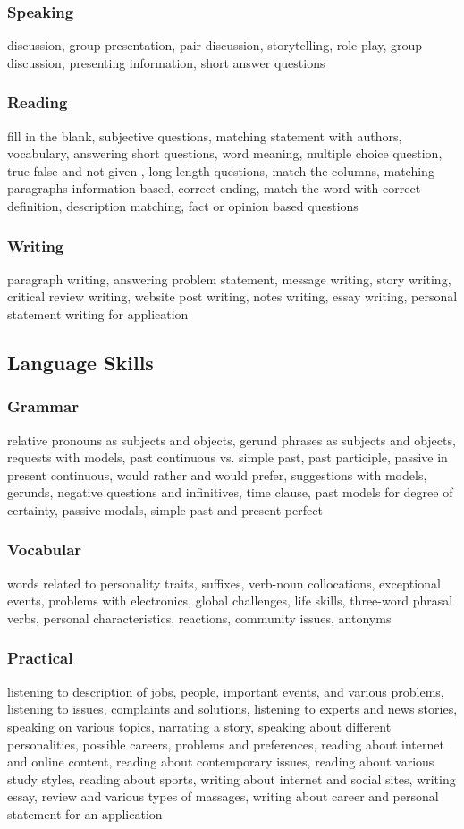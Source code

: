 \documentclass[twocolumn]{article}
\begin{document}
    \subsubsection*{Speaking}
    discussion, group presentation, pair discussion, storytelling, role play, group discussion, presenting information, short answer questions
    \subsubsection*{Reading}
    fill in the blank, subjective questions, matching statement with authors, vocabulary, answering short questions, word meaning, multiple choice question, true false and not given , long length questions, match the columns, matching paragraphs information based, correct ending, match the word with correct definition, description matching, fact or opinion based questions
    \subsubsection*{Writing}
    paragraph writing, answering problem statement, message writing, story writing, critical review writing, website post writing, notes writing, essay writing, personal statement writing for application
    \subsection*{Language Skills}
    \subsubsection*{Grammar}
    relative pronouns as subjects and objects, gerund phrases as subjects and objects, requests with models, past continuous vs. simple past, past participle, passive in present continuous, would rather and would prefer, suggestions with models, gerunds, negative questions and infinitives, time clause, past models for degree of certainty, passive modals, simple past and present perfect
    \subsubsection*{Vocabular}
    words related to personality traits, suffixes, verb-noun collocations, exceptional events, problems with electronics, global challenges, life skills, three-word phrasal verbs, personal characteristics, reactions, community issues, antonyms 
    \subsubsection*{Practical}
    listening to description of jobs, people, important events, and various problems, listening to issues, complaints and solutions, listening to experts and news stories, speaking on various topics, 
    narrating a story, speaking about different personalities, possible careers, problems and preferences, reading about internet and online content, reading about contemporary issues, reading about various 
    study styles, reading about sports, writing about internet and social sites, writing essay, review and various types of massages, writing about career and personal statement for an application
    
\end{document}

